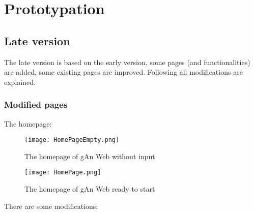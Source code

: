 
\chapter{Prototypation} %

\label{Chapter4} %


\section{Late version}

The late version is based on the early version, some pages (and functionalities) are added, some existing pages are improved. Following all modifications are explained.

\subsection{Modified pages}
The homepage:

\begin{figure}[H]
\centering
\texttt{[image: HomePageEmpty.png]} 
\caption{The homepage of gAn Web without input}
\end{figure}


\begin{figure}[H]
\centering
\texttt{[image: HomePage.png]} 
\caption{The homepage of gAn Web ready to start}
\end{figure}

There are some modifications:

